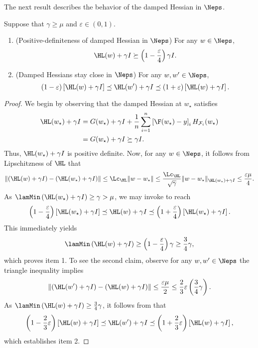 The next result describes the behavior of the damped Hessian in $\Neps$.
\begin{lemma}
\label{lemma:local_hess}
Suppose that $\gamma \geq \mu$ and $\varepsilon\in (0,1)$. 
\begin{enumerate}
    \item (Positive-definiteness of damped Hessian in $\Neps$) For any $w\in \Neps$, 
    \[
    \HL(w)+\gamma I \succeq \left(1-\frac{\varepsilon}{4}\right)\gamma I.
    \]
    \item (Damped Hessians stay close in $\Neps$)
    For any $w,w' \in \Neps$,
    \[
    (1-\varepsilon)\left[\HL(w)+\gamma I\right] \preceq \HL(w')+\gamma I \preceq (1+\varepsilon) \left[\HL(w)+\gamma I\right].
    \]
\end{enumerate}
\end{lemma}
\begin{proof}
    We begin by observing that the damped Hessian at $w_\star$ satisfies
    \begin{align*}
        \HL(w_\star)+\gamma I & = G(w_\star)+\gamma I+\frac{1}{n}\sum_{i=1}^{n}\left[\F(w_\star)-y\right]_{i}H_{\mathcal F_i}(w_\star)\\
        &= G(w_\star)+\gamma I \succeq \gamma I.
    \end{align*}
    Thus, $\HL(w_\star)+\gamma I$ is positive definite. 
    Now, for any $w\in \Neps$, it follows from Lipschitzness of $\HL$ that
    \begin{align*}
        \left\|\left(\HL(w)+\gamma I\right)-\left(\HL(w_\star)+\gamma I\right)\right\|\leq \Lc_{\HL}\|w-w_\star\|\leq \frac{\Lc_{\HL}}{\sqrt{\gamma}}\|w-w_\star\|_{\HL(w_\star)+\gamma I} \leq \frac{\varepsilon \mu}{4}.
    \end{align*}
    As $\lamMin\left(\HL(w_\star)+\gamma I\right)\geq \gamma>\mu$, we may invoke  to reach 
    \[
        \left(1-\frac{\varepsilon}{4}\right)\left[\HL(w_\star)+\gamma I\right]\preceq \HL(w)+\gamma I \preceq \left(1+\frac{\varepsilon}{4}\right)\left[\HL(w_\star)+\gamma I\right].
    \]
    This immediately yields 
    \[
    \lamMin\left(\HL(w)+\gamma I\right)\geq \left(1-\frac{\varepsilon}{4}\right)\gamma \geq \frac{3}{4}\gamma,
    \]
    which proves item 1. 
    To see the second claim, observe for any $w,w'\in \Neps$ the triangle inequality implies
    \[
    \left\|\left(\HL(w')+\gamma I\right)-\left(\HL(w)+\gamma I\right)\right\|\leq \frac{\varepsilon \mu}{2} \leq \frac{2}{3}\varepsilon\left(\frac{3}{4}\gamma\right).
    \]
    As $\lamMin\left(\HL(w)+\gamma I\right)\geq \frac{3}{4}\gamma $, it follows from  that
    \[
    \left(1-\frac{2}{3}\varepsilon\right)\left[\HL(w)+\gamma I\right]\preceq \HL(w')+\gamma I \preceq \left(1+\frac{2}{3}\varepsilon\right)\left[\HL(w)+\gamma I\right],
    \]
    which establishes item 2. 
\end{proof}

